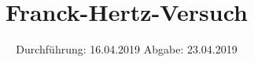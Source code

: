 

\subject{V601}
\title{Franck-Hertz-Versuch}
\date{%
  Durchführung: 16.04.2019
  \hspace{3em}
  Abgabe: 23.04.2019
}



\maketitle
\thispagestyle{empty}
\tableofcontents
\newpage






\printbibliography{}


